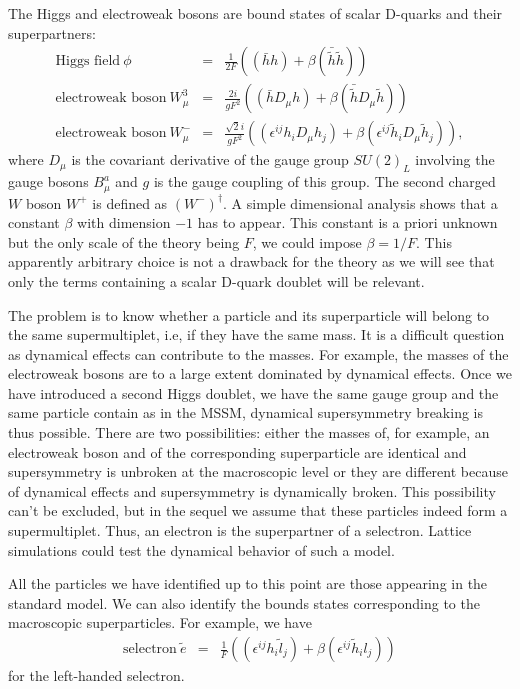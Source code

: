 \documentclass[a4paper,12pt]{article}
\begin{document}
The Higgs and electroweak bosons are bound states of scalar D-quarks and
their superpartners:
\begin{eqnarray} \label{eq3}
\mbox{Higgs field} \ \phi &=& \frac{1}{2 F}
\left ( (\bar h h) + \beta  (\bar{\tilde{h}} \tilde{h}) \right) \\ \nonumber
\mbox{electroweak boson} \ W^3_\mu&=& \frac{2 i}{g F^2}
\left ( (\bar h D_\mu h) +  \beta (\bar{\tilde{h}} D_\mu \tilde{h}) \right ) \\
\mbox{electroweak boson} \ W^-_\mu&=& \frac{\sqrt{2} i}{g F^2}
\left ( (\epsilon^{ij} h_i D_\mu h_j) + \beta
(\epsilon^{ij} \tilde{h}_i D_\mu \tilde{h}_j) \right ), \nonumber
\end{eqnarray}
where $D_\mu$ is the covariant derivative of the gauge group $SU(2)_L$
involving the gauge bosons $B^a_\mu$ and $g$ is the gauge coupling of
this group. The second charged $W$ boson $W^+$ is defined as
$(W^-)^\dagger$. A simple dimensional analysis shows that a constant
$\beta$ with dimension $-1$ has to appear. This constant is a priori
unknown but the only scale of the theory being $F$, we could impose
$\beta=1/F$.  This apparently arbitrary choice is not a drawback for
the theory as we will see that only the terms containing a scalar
D-quark doublet will be relevant. 

The problem is to know whether a particle and its superparticle will
belong to the same supermultiplet, i.e, if they have the same mass. It
is a difficult question as dynamical effects can contribute to the
masses.  For example, the masses of the electroweak bosons are to a
large extent dominated by dynamical effects. Once we have introduced a
second Higgs doublet, we have the same gauge group and the same
particle contain as in the MSSM, dynamical supersymmetry breaking is
thus possible.  There are two possibilities: either the masses of, for
example, an electroweak boson and of the corresponding superparticle
are identical and supersymmetry is unbroken at the macroscopic level
or they are different because of dynamical effects and supersymmetry
is dynamically broken. This possibility can't be excluded, but in the
sequel we assume that these particles indeed form a supermultiplet.
Thus, an electron is the superpartner of a selectron. Lattice
simulations could test the dynamical behavior of such a model.

All the particles we have identified up to this point are those
appearing in the standard model. We can also identify the
bounds states corresponding to the macroscopic superparticles. For
example, we have
\begin{eqnarray}
\mbox{selectron} \ 
\tilde e &=& \frac{1}{F}
\left ( (\epsilon^{ij} h_i \tilde{l}_j)
+ \beta (\epsilon^{ij} \tilde{h}_i l_j) \right ) \nonumber
\end{eqnarray}
for the left-handed selectron.
\end{document}
